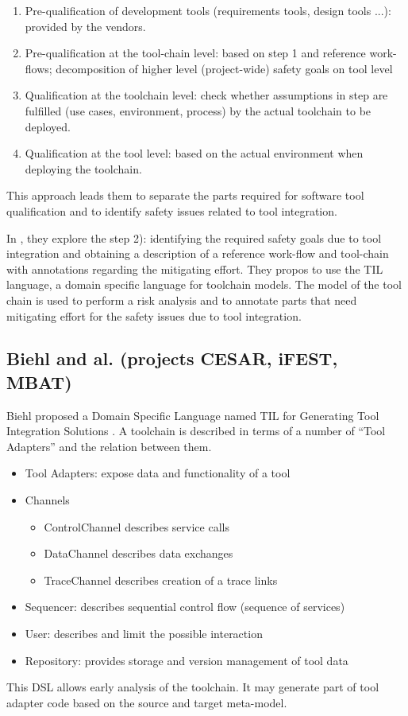 \begin{enumerate}
\item Pre-qualification of development tools (requirements tools, design
  tools ...): provided by the vendors.
\item Pre-qualification at the tool-chain level: based on step 1 and
  reference work-flows; decomposition of higher level (project-wide) safety goals on tool level
\item Qualification at the toolchain level: check whether assumptions in step are fulfilled (use cases, environment, process) by the actual toolchain to be deployed.
\item Qualification at the tool level: based on the actual environment
  when deploying the toolchain.
\end{enumerate}
This approach leads them to separate the parts required for software tool
qualification and to identify safety issues related to tool integration.

In \cite{asplund_towards_2012}, they explore the step 2): identifying
the required safety goals due to tool integration and obtaining a
description of a reference work-flow and tool-chain with annotations regarding the mitigating effort.  They propos to use the TIL language, a
domain specific language for toolchain models.  The model of the tool
chain is used to perform a risk analysis and to annotate parts
that need mitigating effort for the safety issues due to tool
integration. 

\subsection{Biehl and al. (projects CESAR, iFEST, MBAT)}
\label{sec-1-2.3}

Biehl proposed a Domain Specific Language named TIL for Generating Tool Integration
Solutions \cite{biehl_matthias_domain_2011}.  A toolchain is described in terms
of a number of ``Tool Adapters'' and the relation between them.
\begin{itemize}
\item Tool Adapters: expose data and functionality of a tool
\item Channels
  \begin{itemize}
  \item ControlChannel describes service calls
  \item DataChannel describes data exchanges
  \item TraceChannel  describes creation of a trace links
  \end{itemize}

\item Sequencer: describes sequential control flow (sequence of services)
\item User:  describes and limit the possible interaction
\item Repository:  provides storage and version management of tool data
\end{itemize}
This DSL allows early analysis of the toolchain.
It may generate part of tool adapter code based on the source and target
meta-model.

